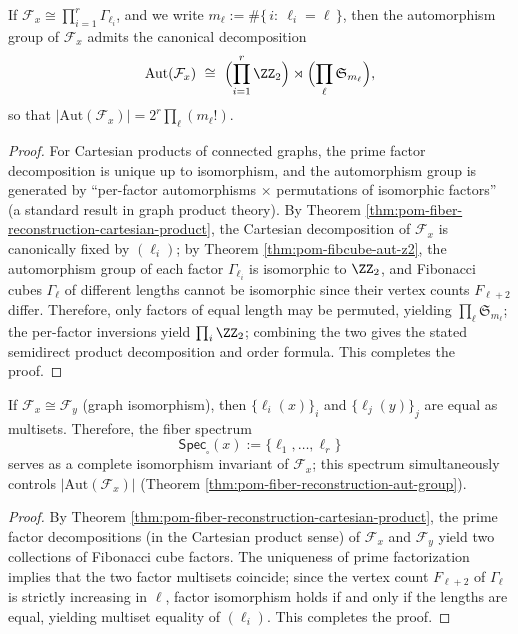 \begin{theorem}\label{thm:pom-fiber-reconstruction-aut-group}
If \(\mathcal F_x\cong\prod_{i=1}^r\Gamma_{\ell_i}\), and we write
\(
m_\ell:=\#\{\,i:\ \ell_i=\ell\,\}
\),
then the automorphism group of \(\mathcal F_x\) admits the canonical decomposition
\[
\mathrm{Aut}(\mathcal F_x)\ \cong\
\Bigl(\prod_{i=1}^r \ZZ_2\Bigr)\rtimes
\Bigl(\prod_{\ell}\mathfrak S_{m_\ell}\Bigr),
\]
so that
\(
|\mathrm{Aut}(\mathcal F_x)|=2^{r}\prod_{\ell}(m_\ell!)
\).
\end{theorem}
\begin{proof}
For Cartesian products of connected graphs, the prime factor decomposition is unique up to isomorphism, and the automorphism group is generated by ``per-factor automorphisms \(\times\) permutations of isomorphic factors'' (a standard result in graph product theory).
By Theorem \ref{thm:pom-fiber-reconstruction-cartesian-product}, the Cartesian decomposition of \(\mathcal F_x\) is canonically fixed by \((\ell_i)\);
by Theorem \ref{thm:pom-fibcube-aut-z2}, the automorphism group of each factor \(\Gamma_{\ell_i}\) is isomorphic to \(\ZZ_2\),
and Fibonacci cubes \(\Gamma_\ell\) of different lengths cannot be isomorphic since their vertex counts \(F_{\ell+2}\) differ.
Therefore, only factors of equal length may be permuted, yielding \(\prod_\ell\mathfrak S_{m_\ell}\);
the per-factor inversions yield \(\prod_i\ZZ_2\);
combining the two gives the stated semidirect product decomposition and order formula. This completes the proof.
\end{proof}

\begin{corollary}\label{cor:pom-fiber-reconstruction-spectrum-complete}
If \(\mathcal F_x\cong \mathcal F_y\) (graph isomorphism), then
\(
\{\ell_i(x)\}_i
\)
and
\(
\{\ell_j(y)\}_j
\)
are equal as multisets.
Therefore, the fiber spectrum
\[
\mathsf{Spec}_{\square}(x):=\{\ell_1,\dots,\ell_r\}
\]
serves as a complete isomorphism invariant of \(\mathcal F_x\); this spectrum simultaneously controls \(|\mathrm{Aut}(\mathcal F_x)|\) (Theorem \ref{thm:pom-fiber-reconstruction-aut-group}).
\end{corollary}
\begin{proof}
By Theorem \ref{thm:pom-fiber-reconstruction-cartesian-product}, the prime factor decompositions (in the Cartesian product sense) of \(\mathcal F_x\) and \(\mathcal F_y\) yield two collections of Fibonacci cube factors.
The uniqueness of prime factorization implies that the two factor multisets coincide;
since the vertex count \(F_{\ell+2}\) of \(\Gamma_\ell\) is strictly increasing in \(\ell\), factor isomorphism holds if and only if the lengths are equal, yielding multiset equality of \((\ell_i)\). This completes the proof.
\end{proof}

